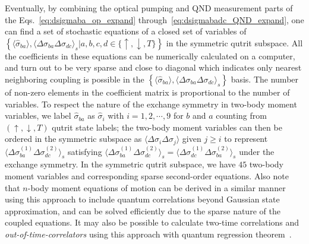 \documentclass[preprint,aps,pra,onecolumn,superscriptaddress]{revtex4-1} %
\newcommand{\expect}[1]{\big\langle #1 \big\rangle}
\begin{document}
\begin{appendix}
Eventually, by combining the optical pumping and QND measurement parts of the Eqs.~\eqref{eq:dsigmaba_op_expand} through~\eqref{eq:dsigmabadc_QND_expand}, one can find a set of stochastic equations of a closed set of variables of $ \left\{\expect{\hat{\sigma}_{ba}},\expect{\Delta\sigma_{ba}\Delta\sigma_{dc} }_s\left|a,b,c,d\in \{\uparrow,\downarrow,T \}\right. \right\} $ in the symmetric qutrit subspace. All the coefficients in these equations can be numerically calculated on a computer, and turn out to be very sparse and close to diagonal which indicates only nearest neighboring coupling is possible in the $\left\{\expect{\hat{\sigma}_{ba}},\expect{\Delta\sigma_{ba}\Delta\sigma_{dc} }_s\right\}$ basis. The number of non-zero elements in the coefficient matrix is proportional to the number of variables. To respect the nature of the exchange symmetry in two-body moment variables, we label $ \hat{\sigma}_{ba} $ as $ \hat{\sigma}_i $ with $ i=1,2,\cdots, 9 $ for $ b$ and $a  $ counting from $ (\uparrow,\downarrow,T) $ qutrit state labels; the two-body moment variables can then be ordered in the symmetric subspace as $ \expect{\Delta\sigma_i\Delta\sigma_j} $ given $ j\ge i $ to represent $ \expect{\!\Delta \sigma_{ba}^{(\!1\!)}\! \Delta \sigma_{dc}^{(\!2\!)}}_s $ satisfying $ \expect{\!\Delta \sigma_{ba}^{(\!1\!)}\! \Delta \sigma_{dc}^{(\!2\!)}}_s=\expect{\!\Delta \sigma_{dc}^{(\!1\!)}\! \Delta \sigma_{ba}^{(\!2\!)}}_s $ under the exchange symmetry. In the symmetric qutrit subspace, we have $ 45 $ two-body moment variables and corresponding sparse second-order equations. Also note that $ n $-body moment equations of motion can be derived in a similar manner using this approach to include quantum correlations beyond Gaussian state approximation, and can be solved efficiently due to the sparse nature of the coupled equations. It may also be possible to calculate two-time correlations and \textit{out-of-time-correlators} using this approach with quantum regression theorem~\cite{Swingle2016Measuring,Swain1981Master}.


\end{appendix}
\end{document}
